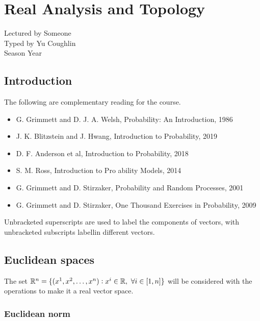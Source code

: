 \documentclass[../Year2.tex]{subfiles}
\begin{document}
\chapter{Real Analysis and Topology}
\renewcommand*\thesection{\arabic{section}}
Lectured by Someone \\ Typed by Yu Coughlin \\
Season Year

\section*{Introduction}

The following are complementary reading for the course.
\begin{itemize}
    \item G. Grimmett and D. J. A. Welsh, Probability: An Introduction, 1986
    \item J. K. Blitzstein and J. Hwang, Introduction to Probability, 2019
    \item D. F. Anderson et al, Introduction to Probability, 2018
    \item S. M. Ross, Introduction to Pro ability Models, 2014
    \item G. Grimmett and D. Stirzaker, Probability and Random Processes, 2001
    \item G. Grimmett and D. Stirzaker, One Thousand Exercises in Probability, 2009
\end{itemize}

\begin{notation*}
    Unbracketed superscripts are used to label the components of vectors, with unbracketed subscripts labellin different vectors.
\end{notation*}

\tableofcontents\pagebreak


\section{Euclidean spaces}

\begin{definition}[$\RR^n$]
    The set $\mathbb{R}^n=\{(x^1,x^2,\ldots,x^n):x^i\in\mathbb{R}, \ \forall i\in[1,n]\}$ will be considered with the operations to make it a real vector space.
\end{definition}

\subsection{Euclidean norm}
\end{document}
